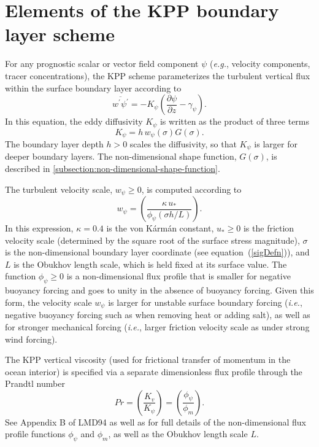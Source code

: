 \documentclass[preprint,12pt,authoryear]{agujournal}
\begin{document}
\section{Elements of the KPP boundary layer scheme}
\label{sec:KPP-describe}

For any prognostic scalar or vector field component $\psi$ (\textit{e.g.}, velocity components, tracer concentrations), the KPP scheme parameterizes the turbulent vertical flux within the surface boundary layer according to 
\begin{equation}
\label{KPPflux}
\overline{w^\prime \psi^\prime} = -K_\psi \left(\frac{\partial \psi}{\partial z} - \gamma_\psi\right).
\end{equation}
In this equation, the eddy diffusivity $K_\psi$ is written as the product of three terms
\begin{equation}
\label{KPPDiffusivity}
K_\psi = h\, w_\psi \left(\sigma\right)G\left(\sigma \right).
\end{equation}
The boundary layer depth $h >0$ scales the diffusivity, so that $K_\psi$ is larger for deeper boundary layers. The non-dimensional shape function, $G(\sigma)$, is described in \ref{subsection:non-dimensional-shape-function}.  

The turbulent velocity scale, $w_\psi \ge 0$, is computed according to \begin{equation}
\label{wpsi}
w_\psi = \left( \frac{\kappa \, u_*}{\phi_\psi (\sigma h/L)} \right).
\end{equation}
In this expression, $\kappa = 0.4$ is the von K\'{a}rm\'{a}n constant, $u_* \ge 0$ is the friction velocity scale (determined by the square root of the surface stress magnitude), $\sigma$ is the non-dimensional boundary layer coordinate (see equation~(\ref{sigDefn})), and $L$ is the Obukhov length scale, which is held fixed at its surface value. The function $\phi_\psi \ge 0$ is a non-dimensional flux profile that is smaller for negative buoyancy forcing and goes to unity in the absence of buoyancy forcing. Given this form, the velocity scale $w_\psi$ is larger for unstable surface boundary forcing (\textit{i.e.}, negative buoyancy forcing such as when removing heat or adding salt), as well as for stronger mechanical forcing (\textit{i.e.}, larger friction velocity scale as under strong wind forcing). 

The KPP vertical viscosity (used for frictional transfer of momentum in the ocean interior) is specified via a separate dimensionless flux profile through the Prandtl number
\begin{equation}
Pr = \left( \frac{K_v}{K_\psi} \right) 
= \left( \frac{\phi_\psi}{\phi_m} \right).
\end{equation}
See Appendix B of LMD94 as well as \cite{Griffies2015} for full details of the non-dimensional flux profile functions $\phi_\psi$ and $\phi_m$, as well as the Obukhov length scale $L$.  
\end{document}
